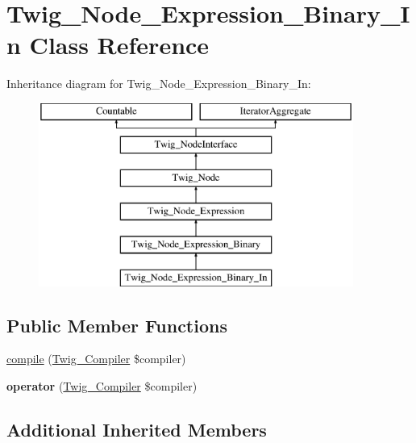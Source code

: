 \hypertarget{class_twig___node___expression___binary___in}{}\section{Twig\+\_\+\+Node\+\_\+\+Expression\+\_\+\+Binary\+\_\+\+In Class Reference}
\label{class_twig___node___expression___binary___in}
Inheritance diagram for Twig\+\_\+\+Node\+\_\+\+Expression\+\_\+\+Binary\+\_\+\+In\+:\begin{figure}[H]
\begin{center}
\leavevmode
\includegraphics[height=6.000000cm]{class_twig___node___expression___binary___in}
\end{center}
\end{figure}
\subsection*{Public Member Functions}
\begin{DoxyCompactItemize}
\item 
\hyperlink{class_twig___node___expression___binary___in_a4e0faa87c3fae583620b84d3607085da}{compile} (\hyperlink{class_twig___compiler}{Twig\+\_\+\+Compiler} \$compiler)
\item 
\hypertarget{class_twig___node___expression___binary___in_af77318ec88d5f8a508684970a150b670}{}{\bfseries operator} (\hyperlink{class_twig___compiler}{Twig\+\_\+\+Compiler} \$compiler)\label{class_twig___node___expression___binary___in_af77318ec88d5f8a508684970a150b670}

\end{DoxyCompactItemize}
\subsection*{Additional Inherited Members}


